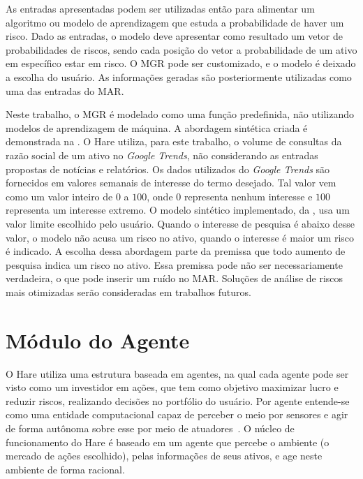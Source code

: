As entradas apresentadas podem ser utilizadas então para alimentar um algoritmo ou modelo de aprendizagem que estuda a probabilidade de haver um risco. Dado as entradas, o modelo deve apresentar como resultado um vetor de probabilidades de riscos, sendo cada posição do vetor a probabilidade de um ativo em específico estar em risco. O \acrshort{MGR} pode ser customizado, e o modelo é deixado a escolha do usuário. As informações geradas são posteriormente utilizadas como uma das entradas do \acrshort{MAR}.

Neste trabalho, o \acrshort{MGR} é modelado como uma função predefinida, não utilizando modelos de aprendizagem de máquina. A abordagem sintética criada é demonstrada na . O Hare utiliza, para este trabalho, o volume de consultas da razão social de um ativo no \emph{Google Trends}, não considerando as entradas propostas de notícias e relatórios. Os dados utilizados do \emph{Google Trends} são fornecidos em valores semanais de interesse do termo desejado. Tal valor vem como um valor inteiro de $0$ a $100$, onde $0$ representa nenhum interesse e $100$ representa um interesse extremo. O modelo sintético implementado, da , usa um valor limite escolhido pelo usuário. Quando o interesse de pesquisa é abaixo desse valor, o modelo não acusa um risco no ativo, quando o interesse é maior um risco é indicado. A escolha dessa abordagem parte da premissa que todo aumento de pesquisa indica um risco no ativo. Essa premissa pode não ser necessariamente verdadeira, o que pode inserir um ruído no \acrfull{MAR}. Soluções de análise de riscos mais otimizadas serão consideradas em trabalhos futuros. 


%



\section{Módulo do Agente}
\label{SEC:AGENT}

O Hare utiliza uma estrutura baseada em agentes, na qual cada agente pode ser visto como um investidor em ações, que tem como objetivo maximizar lucro e reduzir riscos, realizando decisões no portfólio do usuário. Por agente entende-se como uma entidade computacional capaz de perceber o meio por sensores e agir de forma autônoma sobre esse por meio de atuadores~\cite{modern_approach}. O núcleo de funcionamento do Hare é baseado em um agente que percebe o ambiente (o mercado de ações escolhido), pelas informações de seus ativos, e age neste ambiente de forma racional. 

